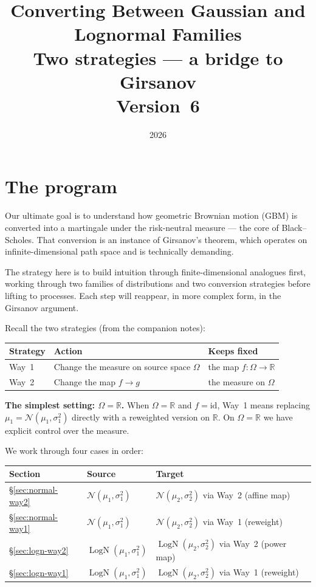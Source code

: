 \documentclass[11pt,a4paper]{article}
\title{Converting Between Gaussian and Lognormal Families\\[4pt]
       \large Two strategies --- a bridge to Girsanov\\[4pt]
       \normalsize Version~6}
\date{2026}
\author{}
\newcommand{\N}{\mathcal{N}}
\newcommand{\LN}{\operatorname{LogN}}
\newcommand{\R}{\mathbb{R}}
\begin{document}
\maketitle
\tableofcontents
\bigskip

\section{The program}
\label{sec:program}

Our ultimate goal is to understand how geometric Brownian motion (GBM) is converted into a
martingale under the risk-neutral measure --- the core of Black--Scholes.  That conversion is an
instance of Girsanov's theorem, which operates on infinite-dimensional path space and is
technically demanding.

The strategy here is to build intuition through finite-dimensional analogues first, working
through two families of distributions and two conversion strategies before lifting to processes.
Each step will reappear, in more complex form, in the Girsanov argument.

Recall the two strategies (from the companion notes):

\medskip
\begin{center}
\begin{tabular}{lll}
\toprule
\textbf{Strategy} & \textbf{Action} & \textbf{Keeps fixed} \\
\midrule
Way~1 & Change the measure on source space $\Omega$ & the map $f:\Omega\to\R$ \\
Way~2 & Change the map $f\to g$                    & the measure on $\Omega$ \\
\bottomrule
\end{tabular}
\end{center}
\medskip

\noindent\textbf{The simplest setting: $\Omega=\R$.}
When $\Omega=\R$ and $f=\mathrm{id}$, Way~1 means replacing
$\mu_1=\N(\mu_1,\sigma_1^2)$ directly with a reweighted version on $\R$.
On $\Omega=\R$ we have explicit control over the measure.

We work through four cases in order:
\medskip
\begin{center}
\begin{tabular}{lll}
\toprule
\textbf{Section} & \textbf{Source} & \textbf{Target} \\
\midrule
\S\ref{sec:normal-way2} & $\N(\mu_1,\sigma_1^2)$ & $\N(\mu_2,\sigma_2^2)$ via Way~2 (affine map) \\
\S\ref{sec:normal-way1} & $\N(\mu_1,\sigma_1^2)$ & $\N(\mu_2,\sigma_2^2)$ via Way~1 (reweight) \\
\S\ref{sec:logn-way2}   & $\LN(\mu_1,\sigma_1^2)$ & $\LN(\mu_2,\sigma_2^2)$ via Way~2 (power map) \\
\S\ref{sec:logn-way1}   & $\LN(\mu_1,\sigma_1^2)$ & $\LN(\mu_2,\sigma_2^2)$ via Way~1 (reweight) \\
\bottomrule
\end{tabular}
\end{center}
\end{document}
